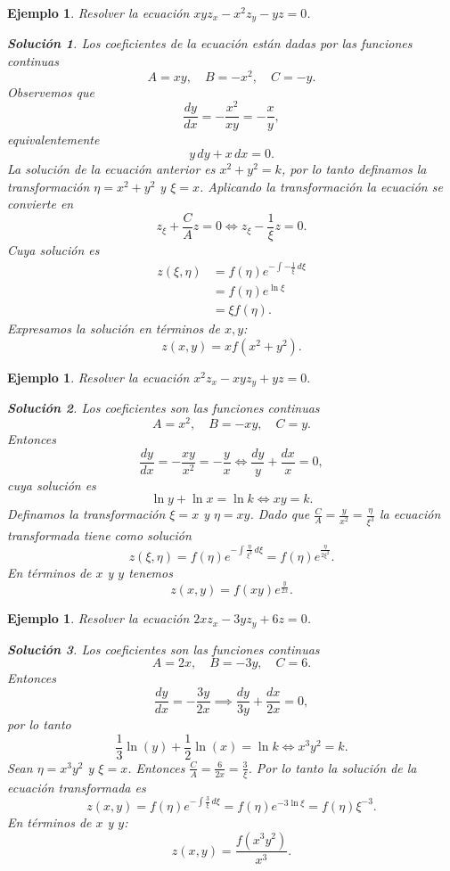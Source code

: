 \documentclass[11pt,letterpaper]{report}
\newtheorem{example}[defn]{Ejemplo}
\newtheorem*{sol}{Solución}
\newcommand\<{\langle}
\renewcommand\>{\rangle}
\begin{document}
\begin{example}
  Resolver la ecuación $xy z_x - x^2 z_y - yz = 0$.
  \begin{sol}
    Los coeficientes de la ecuación están dadas por las
    funciones continuas
    \[
    A = xy, \quad B = -x^2, \quad C = -y.
    \] 
    Observemos que
    \[
    \frac{dy}{dx} = -\frac{x^2}{xy} = -\frac{x}{y},
    \] 
    equivalentemente
    \[
    y \, dy + x \, dx = 0.
    \] 
    La solución de la ecuación anterior es $x^2 + y^2 = k$,
    por lo tanto definamos la transformación $\eta = x^2 +
    y^2$ y $\xi = x$. Aplicando la transformación la
    ecuación se convierte en
    \[
    z_\xi + \frac{C}{A} z = 0 \iff z_\xi - \frac{1}{\xi} z =
    0.
    \]
    Cuya solución es
    \begin{align*}
      z(\xi,\eta) &= f(\eta)e^{-\int -\frac{1}{\xi} \,
      d\xi}\\
                  &= f(\eta)e^{\ln \xi}\\
                  &= \xi f(\eta).
    \end{align*} 
    Expresamos la solución en términos de $x,y$: 
    \[
      z(x,y) = xf(x^2+y^2).
    \] 
  \end{sol}
\end{example}

\begin{example}
  Resolver la ecuación $x^2 z_x - xy z_y + yz = 0.$
  \begin{sol}
    Los coeficientes son las funciones continuas
    \[
    A = x^2, \quad B = -xy, \quad C = y.
    \] 
    Entonces
    \[
    \frac{dy}{dx} = -\frac{xy}{x^2} = -\frac{y}{x} \iff
    \frac{dy}{y} + \frac{dx}{x} = 0,
    \] 
    cuya solución es
    \[
    \ln y + \ln x = \ln k \iff xy = k.
    \]
    Definamos la transformación $\xi = x$ y $\eta = xy$.
    Dado que $\frac{C}{A} = \frac{y}{x^2} =
    \frac{\eta}{\xi^3}$ la ecuación transformada tiene como
    solución
    \[
    z(\xi,\eta) = f(\eta)e^{-\int \frac{\eta}{\xi^3} \, d\xi} =
    f(\eta)e^{\frac{\eta}{2\xi^2}}.
    \] 
    En términos de $x$ y $y$ tenemos
    \[
    z(x,y) = f(xy)e^{\frac{y}{2x}}.
    \] 
  \end{sol}
\end{example}

\begin{example}
  Resolver la ecuación $2x z_x - 3y z_y + 6z = 0$.
  \begin{sol}
    Los coeficientes son las funciones continuas
    \[
    A = 2x, \quad B = -3y, \quad C = 6.
    \] 
    Entonces
    \[
    \frac{dy}{dx} = -\frac{3y}{2x} \implies \frac{dy}{3y} +
    \frac{dx}{2x} = 0,
    \]
    por lo tanto
    \[
    \frac{1}{3}\ln(y) + \frac{1}{2}\ln(x) = \ln k \iff
    x^3y^2 = k.
    \] 
    Sean $\eta = x^3 y^2$ y $\xi = x$. Entonces $\frac{C}{A}
    = \frac{6}{2x} = \frac{3}{\xi}$. Por lo tanto la
    solución de la ecuación transformada es
    \[
    z(x,y) = f(\eta)e^{-\int \frac{3}{\xi} \, d\xi} =
    f(\eta)e^{-3\ln \xi} = f(\eta) \xi^{-3}.
    \] 
    En términos de $x$ y $y$:
    \[
    z(x,y) = \frac{f(x^3y^2)}{x^3}.
    \] 
  \end{sol}
\end{example}
\end{document}
